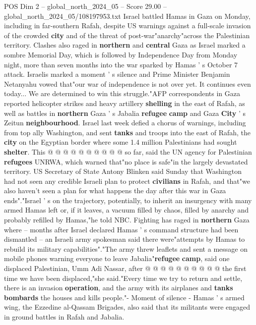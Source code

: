 \begin{textsample}{POS Dim 2 – global\_north\_2024\_05 – Score 29.00 – global\_north\_2024\_05/108197953.txt}  \label{ex:f2_pos_300}
Israel battled Hamas in Gaza on Monday, including in far-southern Rafah, despite US warnings against a full-scale invasion of the crowded \textbf{city} and of the threat of post-war"anarchy"across the Palestinian territory.
Clashes also raged in \textbf{northern} and \textbf{central} Gaza as Israel marked a sombre Memorial Day, which is followed by Independence Day from Monday night, more than seven months into the war sparked by Hamas ' s October 7 attack.
Israelis marked a moment ' s silence and Prime Minister Benjamin Netanyahu vowed that"our war of independence is not over yet.
It continues even today...
We are determined to win this struggle."AFP correspondents in Gaza reported helicopter strikes and heavy artillery \textbf{shelling} in the east of Rafah, as well as battles in \textbf{northern} Gaza ' s Jabalia \textbf{refugee} \textbf{camp} and Gaza \textbf{City} ' s Zeitun \textbf{neighbourhood}.
Israel last week defied a chorus of warnings, including from top ally Washington, and sent \textbf{tanks} and troops into the east of Rafah, the \textbf{city} on the Egyptian border where some 1.4 million Palestinians had sought \textbf{shelter}.
This @ @ @ @ @ @ @ @ @ @ so far, said the UN agency for Palestinian \textbf{refugees} UNRWA, which warned that"no place is safe"in the largely devastated territory.
US Secretary of State Antony Blinken said Sunday that Washington had not seen any credible Israeli plan to protect \textbf{civilians} in Rafah, and that"we also haven't seen a plan for what happens the day after this war in Gaza ends"."Israel ' s on the trajectory, potentially, to inherit an insurgency with many armed Hamas left or, if it leaves, a vacuum filled by chaos, filled by anarchy and probably refilled by Hamas,"he told NBC.
Fighting has raged in \textbf{northern} Gaza where -- months after Israel declared Hamas ' s command structure had been dismantled -- an Israeli army spokesman said there were"attempts by Hamas to rebuild its military capabilities"."The army threw leaflets and sent a message on mobile phones warning everyone to leave Jabalia"\textbf{refugee} \textbf{camp}, said one displaced Palestinian, Umm Adi Nassar, after @ @ @ @ @ @ @ @ @ @ the first time we have been displaced,"she said."Every time we try to return and settle, there is an invasion \textbf{operation}, and the army with its airplanes and \textbf{tanks} \textbf{bombards} the houses and kills people."- Moment of silence - Hamas ' s armed wing, the Ezzedine al-Qassam Brigades, also said that its militants were engaged in ground battles in Rafah and Jabalia.

\end{textsample}
